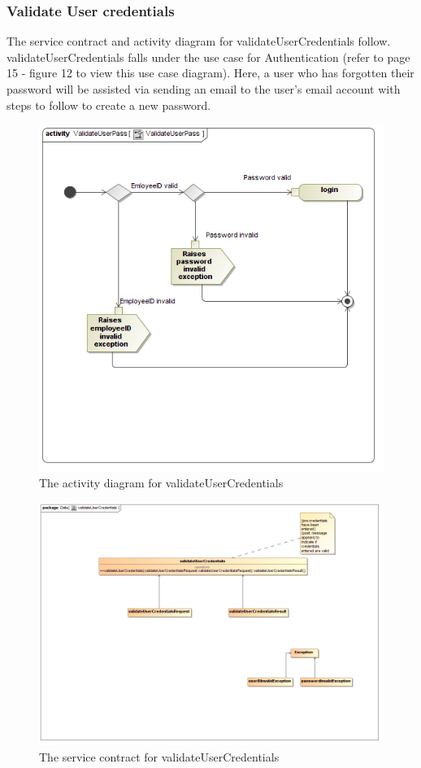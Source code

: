 \documentclass[a4paper,12pt]{report}
\begin{document}
\subsubsection{Validate User credentials }
The service contract and activity diagram for validateUserCredentials follow. validateUserCredentials falls under the use case for Authentication (refer to page 15 - figure 12 to view this use case diagram). Here, a user who has forgotten their password will be assisted via sending an email to the user's email account with steps to follow to create a new password.
\begin{figure}[H]
  \centering
    \includegraphics[width=1.0\textwidth]{../images/ValidateUserPassActivity.png}
    \caption{The activity diagram for validateUserCredentials} 
\end{figure}
\begin{figure}[H]
  \centering
    \includegraphics[width=1.0\textwidth]{../images/validateUserCredentials.png}
    \caption{The service contract for validateUserCredentials} 
\end{figure}
\end{document}
